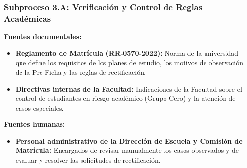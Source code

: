\subsubsection{Subproceso 3.A: Verificación y Control de Reglas Académicas}

\textbf{Fuentes documentales:}
\begin{itemize}
    \item \textbf{Reglamento de Matrícula (RR-0570-2022):} Norma de la universidad que define los requisitos de los planes de estudio, los motivos de observación de la Pre-Ficha y las reglas de rectificación.
    \item \textbf{Directivas internas de la Facultad:} Indicaciones de la Facultad sobre el control de estudiantes en riesgo académico (Grupo Cero) y la atención de casos especiales.
\end{itemize}

\textbf{Fuentes humanas:}
\begin{itemize}
    \item \textbf{Personal administrativo de la Dirección de Escuela y Comisión de Matrícula:} Encargados de revisar manualmente los casos observados y de evaluar y resolver las solicitudes de rectificación.
\end{itemize}
